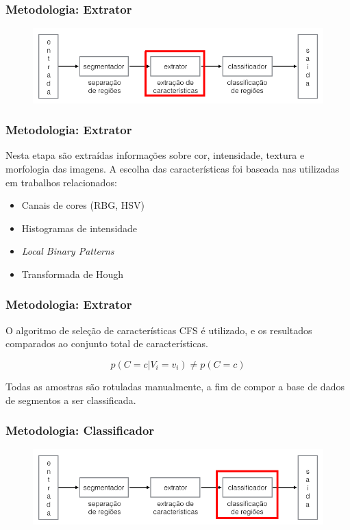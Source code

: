 \documentclass[t]{beamer}
\begin{document}
\begin{frame}[c]
	\frametitle{Metodologia: Extrator}
	\begin{figure}[h]
    	\includegraphics[width=\textwidth]{imgs/arquitetura_3}
	\end{figure}
\end{frame}

\begin{frame}[c]

	\frametitle{Metodologia: Extrator}

	Nesta etapa são extraídas informações sobre cor, intensidade, textura e morfologia das imagens. A escolha das características foi baseada nas utilizadas em trabalhos relacionados:

	\begin{itemize}
		\item Canais de cores (RBG, HSV)
		\item Histogramas de intensidade
		\item \textit{Local Binary Patterns}
		\item Transformada de Hough
	\end{itemize}
\end{frame}

\begin{frame}[c]

	\frametitle{Metodologia: Extrator}

	O algoritmo de seleção de características CFS é utilizado, e os resultados comparados ao conjunto total de características.

	\vspace{0.5cm}

	\begin{equation*}
		\displaystyle p(C=c|V_i=v_i) \neq p(C=c)
	\end{equation*}

	\vspace{0.5cm}

	Todas as amostras são rotuladas manualmente, a fim de compor a base de dados de segmentos a ser classificada.
\end{frame}

\begin{frame}[c]
	\frametitle{Metodologia: Classificador}
	\begin{figure}[h]
    	\includegraphics[width=\textwidth]{imgs/arquitetura_4}
	\end{figure}
\end{frame}
\end{document}
